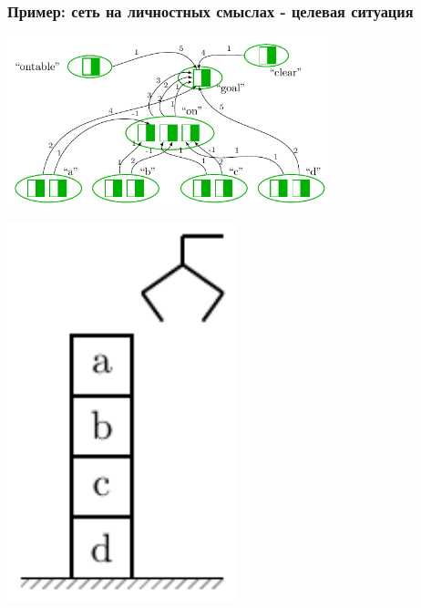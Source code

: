 \documentclass[default]{beamer}
\begin{document}
	\begin{frame}
		\frametitle{Пример: сеть на личностных смыслах - целевая ситуация}
		\centering
		\includegraphics[page=1,width=0.7\textwidth]{plan/plan_nets}
		\par\bigskip
		\includegraphics[page=2,width=0.5\textwidth]{plan/block_world}
	\end{frame}	
\end{document}
